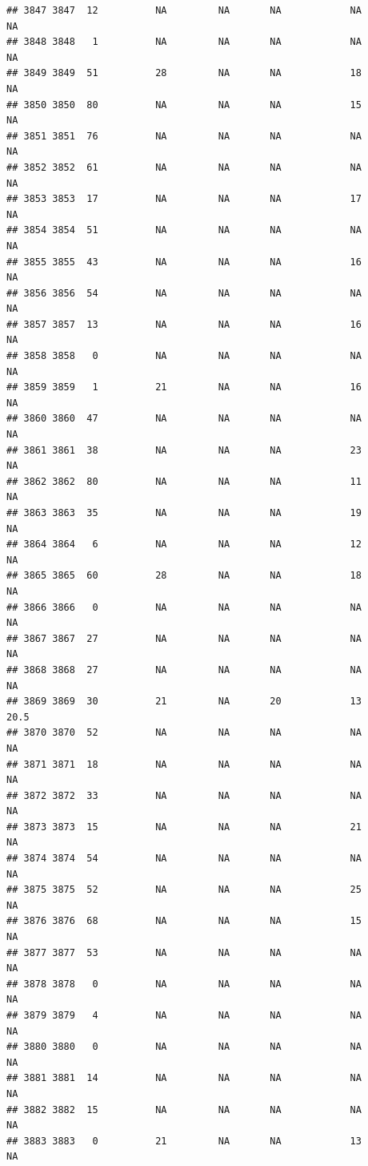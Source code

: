 \documentclass[man]{apa6}
\begin{document}
\begin{verbatim}
## 3847 3847  12          NA         NA       NA            NA       NA
## 3848 3848   1          NA         NA       NA            NA       NA
## 3849 3849  51          28         NA       NA            18       NA
## 3850 3850  80          NA         NA       NA            15       NA
## 3851 3851  76          NA         NA       NA            NA       NA
## 3852 3852  61          NA         NA       NA            NA       NA
## 3853 3853  17          NA         NA       NA            17       NA
## 3854 3854  51          NA         NA       NA            NA       NA
## 3855 3855  43          NA         NA       NA            16       NA
## 3856 3856  54          NA         NA       NA            NA       NA
## 3857 3857  13          NA         NA       NA            16       NA
## 3858 3858   0          NA         NA       NA            NA       NA
## 3859 3859   1          21         NA       NA            16       NA
## 3860 3860  47          NA         NA       NA            NA       NA
## 3861 3861  38          NA         NA       NA            23       NA
## 3862 3862  80          NA         NA       NA            11       NA
## 3863 3863  35          NA         NA       NA            19       NA
## 3864 3864   6          NA         NA       NA            12       NA
## 3865 3865  60          28         NA       NA            18       NA
## 3866 3866   0          NA         NA       NA            NA       NA
## 3867 3867  27          NA         NA       NA            NA       NA
## 3868 3868  27          NA         NA       NA            NA       NA
## 3869 3869  30          21         NA       20            13     20.5
## 3870 3870  52          NA         NA       NA            NA       NA
## 3871 3871  18          NA         NA       NA            NA       NA
## 3872 3872  33          NA         NA       NA            NA       NA
## 3873 3873  15          NA         NA       NA            21       NA
## 3874 3874  54          NA         NA       NA            NA       NA
## 3875 3875  52          NA         NA       NA            25       NA
## 3876 3876  68          NA         NA       NA            15       NA
## 3877 3877  53          NA         NA       NA            NA       NA
## 3878 3878   0          NA         NA       NA            NA       NA
## 3879 3879   4          NA         NA       NA            NA       NA
## 3880 3880   0          NA         NA       NA            NA       NA
## 3881 3881  14          NA         NA       NA            NA       NA
## 3882 3882  15          NA         NA       NA            NA       NA
## 3883 3883   0          21         NA       NA            13       NA

\end{verbatim}
\end{document}
